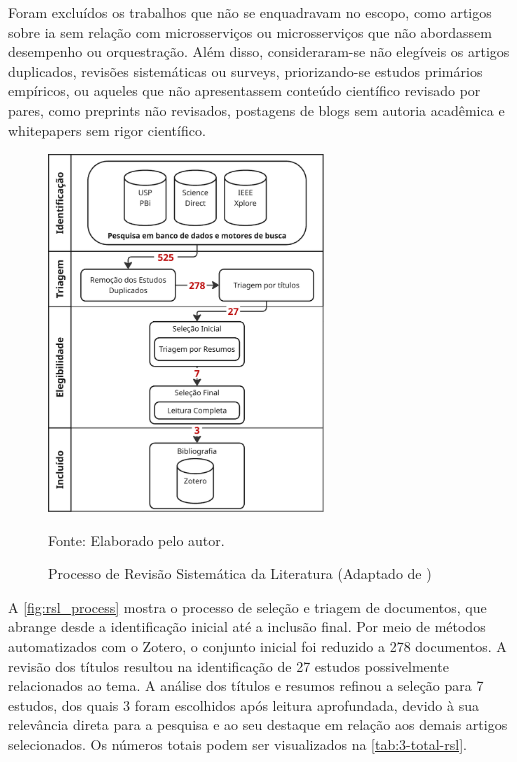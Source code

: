 Foram excluídos os trabalhos que não se enquadravam no escopo, como artigos sobre \acrfull{ia} sem relação com microsserviços ou microsserviços que não abordassem desempenho ou orquestração. Além disso, consideraram-se não elegíveis os artigos duplicados, revisões sistemáticas ou surveys, priorizando-se estudos primários empíricos, ou aqueles que não apresentassem conteúdo científico revisado por pares, como preprints não revisados, postagens de blogs sem autoria acadêmica e whitepapers sem rigor científico.

\begin{figure}[H]
\centering
\caption{Processo de Revisão Sistemática da Literatura (Adaptado de \textcite{scannavino_revisao_2017})}
\includegraphics[width=0.65\textwidth]{imagens/3-revisao-literatura.png} 
\label{fig:rsl_process}
{\par \raggedright \footnotesize Fonte: Elaborado pelo autor.}
\end{figure}

A \autoref{fig:rsl_process} mostra o processo de seleção e triagem de documentos, que abrange desde a identificação inicial até a inclusão final. Por meio de métodos automatizados com o Zotero, o conjunto inicial foi reduzido a 278 documentos. A revisão dos títulos resultou na identificação de 27 estudos possivelmente relacionados ao tema. A análise dos títulos e resumos refinou a seleção para 7 estudos, dos quais 3 foram escolhidos após leitura aprofundada, devido à sua relevância direta para a pesquisa e ao seu destaque em relação aos demais artigos selecionados. Os números totais podem ser visualizados na \autoref{tab:3-total-rsl}.

